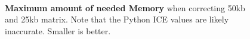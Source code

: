 \begin{figure}[t]
    \begin{centering}
         \\
        \caption[Maximum needed Memory]
        {\textbf{Maximum amount of needed Memory} when correcting 50kb and 25kb
        matrix. Note that the Python ICE values are likely inaccurate. Smaller is better.}
        \label{fig:maxresident}
    \end{centering}
\end{figure}


